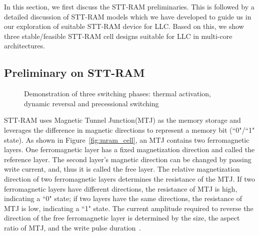 In this section, we first discuss the STT-RAM preliminaries. This is followed by a detailed discussion of
STT-RAM models which we have developed to guide us in our exploration of suitable STT-RAM device for
LLC. Based on this, we show three stable/feasible STT-RAM cell designs
suitable for LLC in multi-core architectures.
\subsection{Preliminary on STT-RAM}
\begin{figure*} [t]
\centering
\begin{minipage}{0.575\textwidth}
\centering
 \caption{\label{fig:mram_cell} (a) Structural view of an STT-RAM Cache Cell
 (b) Anti-Parallel High Resistance, Indicating ``0" state (c) Parallel Low Resistance, Indicating ``1" state}
\end{minipage}
\hfill
\begin{minipage}{0.375\textwidth}
\centering
 \caption{\label{fig:IcWt} Demonstration of three switching phases:
 thermal activation, dynamic reversal and precessional switching }
\end{minipage}
\end{figure*}

STT-RAM uses Magnetic Tunnel Junction(MTJ) as the memory storage and leverages the difference in
magnetic directions to represent a memory bit (``0"/``1" state). As shown in
Figure~\ref{fig:mram_cell}, an MTJ contains two ferromagnetic layers. One ferromagnetic layer has a
fixed magnetization direction and called the reference layer. The second layer's magnetic
direction can be changed by passing write current, and, thus it is called the free layer. The
relative magnetization direction of two ferromagnetic layers determines the resistance of the MTJ.  If
two ferromagnetic layers have different directions, the resistance of MTJ is high, indicating a ``0"
state; if two layers have the same directions, the resistance of MTJ is low, indicating a ``1"
state. The current amplitude required to reverse the
direction of the free ferromagnetic layer is determined by the size, the aspect ratio of MTJ, and
the write pulse duration~\cite{STTRAM:JAP07, STTRAM:Qualcomm09}.

